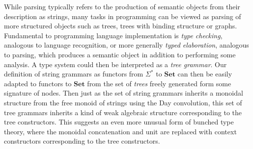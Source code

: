 \documentclass[sigconf,anonymous,review,screen]{acmart}
\newcommand{\Set}{\mathbf{Set}}
\begin{document}
While parsing typically refers to the production of semantic objects
from their description as strings, many tasks in programming can be
viewed as parsing of more structured objects such as trees, trees with
binding structure or graphs. Fundamental to programming language
implementation is \emph{type checking}, analogous to language
recognition, or more generally \emph{typed elaboration}, analogous to
parsing, which produces a semantic object in addition to performing
some analysis. A type system could then be interpreted as a \emph{tree
grammar}. Our definition of string grammars as functors from
$\Sigma^*$ to $\Set$ can then be easily adapted to functors to $\Set$
from the set of \emph{trees} freely generated form some signature of
nodes. Then just as the set of string grammars inherits a monoidal
structure from the free monoid of strings using the Day convolution,
this set of tree grammars inherits a kind of weak algebraic structure
corresponding to the tree constructors. This suggests an even more
unusual form of bunched type theory, where the monoidal concatenation
and unit are replaced with context constructors corresponding to the
tree constructors.
\end{document}
